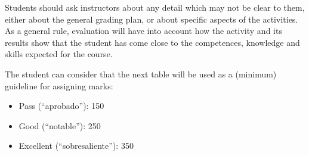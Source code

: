 \documentclass[a4paper]{article}
\begin{document}
Students should ask instructors about any detail which may not be clear to them, either about the general grading plan, or about specific aspects of the activities. As a general rule, evaluation will have into account how the activity and its results show that the student has come close to the competences, knowledge and skills expected for the course.

The student can consider that the next table will be used as a (minimum) guideline for assigning marks:

\begin{itemize}
\item Pass (``aprobado''): 150
\item Good (``notable''): 250
\item Excellent (``sobresaliente''): 350
\end{itemize}
\end{document}
